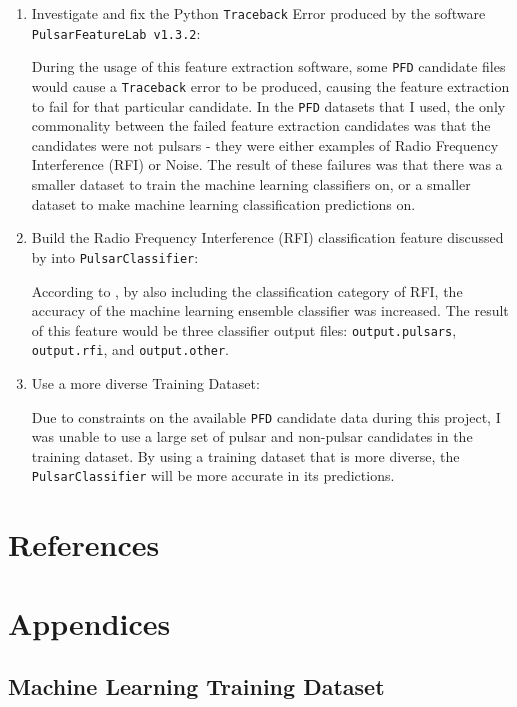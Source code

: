 \documentclass{article}
\begin{document}
\begin{enumerate}
    \item Investigate and fix the Python \verb|Traceback| Error produced by the software \verb|PulsarFeatureLab v1.3.2|:

    During the usage of this feature extraction software, some \verb|PFD| candidate files would cause a \verb|Traceback| error to be produced, causing the feature extraction to fail for that particular candidate. In the \verb|PFD| datasets that I used, the only commonality between the failed feature extraction candidates was that the candidates were not pulsars - they were either examples of Radio Frequency Interference (RFI) or Noise. The result of these failures was that there was a smaller dataset to train the machine learning classifiers on, or a smaller dataset to make machine learning classification predictions on.

    \item Build the Radio Frequency Interference (RFI) classification feature discussed by \textcite{tan} into \verb|PulsarClassifier|:
    
    According to \textcite{tan}, by also including the classification category of RFI, the accuracy of the machine learning ensemble classifier was increased. The result of this feature would be three classifier output files: \verb|output.pulsars|, \verb|output.rfi|, and \verb|output.other|.

    \item Use a more diverse Training Dataset:

    Due to constraints on the available \verb|PFD| candidate data during this project, I was unable to use a large set of pulsar and non-pulsar candidates in the training dataset. By using a training dataset that is more diverse, the \verb|PulsarClassifier| will be more accurate in its predictions.
\end{enumerate}

\pagebreak
\section{References}
\printbibliography[heading=none]

\pagebreak
\section{Appendices}
\subsection{Machine Learning Training Dataset}

\end{document}
